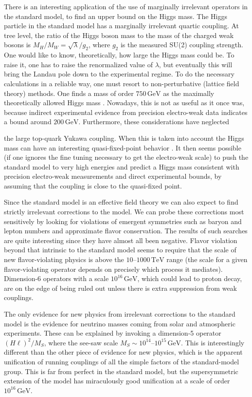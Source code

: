 There is an interesting application of the use of marginally irrelevant
operators in the standard model, to find an upper bound on the Higgs mass. The
Higgs particle in the standard model has a marginally irrelevant quartic
coupling. At tree level, the ratio of the Higgs boson mass to the mass of the
charged weak bosons is $M_H/M_W=\sqrt{\lambda}/g_2$, where $g_2$ is the measured
SU(2) coupling strength. One would like to know, theoretically, how large the
Higgs mass could be. To raise it, one has to raise the renormalized value of
$\lambda$, but eventually this will bring the Landau pole down to the
experimental regime. To do the necessary calculations in a reliable way, one
must resort to non-perturbative (lattice field theory) methods. One finds a
mass of order $750\,\mathrm{GeV}$ as the maximally theoretically allowed Higgs
mass \cite{banks-ref-133,banks-ref-134}. Nowadays, this is not as useful as it
once was, because indirect experimental evidence from precision electro-weak
data indicates a bound around $200\,\mathrm{GeV}$. Furthermore, these
considerations have neglected

the large top-quark Yukawa coupling. When this is taken into account the Higgs
mass can have an interesting quasi-fixed-point behavior \cite{banks-ref-130}.
It then seems possible (if one ignores the fine tuning necessary to get the
electro-weak scale) to push the standard model to very high energies and
predict a Higgs mass consistent with precision electro-weak measurements and
direct experimental bounds, by assuming that the coupling is close to the
quasi-fixed point.

Since the standard model is an effective field theory we can also expect to
find strictly irrelevant corrections to the model. We can probe these
corrections most sensitively by looking for violations of emergent symmetries
such as baryon and lepton numbers and approximate flavor conservation. The
results of such searches are quite interesting since they have almost all been
negative. Flavor violation beyond that intrinsic to the standard model seems
to require that the scale of new flavor-violating physics is above the
$10$--$1000\,\mathrm{TeV}$ range (the scale for a given flavor-violating
operator depends on precisely which process it mediates). Dimension-6
operators with a scale $10^{16}\,\mathrm{GeV}$, which could lead to proton
decay, are on the edge of being ruled out unless there is extra suppression from
weak couplings.

The only evidence for new physics from irrelevant corrections to the standard
model is the evidence for neutrino masses coming from solar and atmospheric
experiments. These can be explained by invoking a dimension-5 operator
$(H\ell)^2/M_S$, where the see-saw scale $M_S\sim10^{14}$--$10^{15}\,\mathrm{GeV}$.
This is interestingly different than the other piece of evidence for new
physics, which is the apparent unification of running couplings of all the
simple factors of the standard-model group. This is far from perfect in the
standard model, but the supersymmetric extension of the model has miraculously
good unification at a scale of order $10^{16}\,\mathrm{GeV}$.

